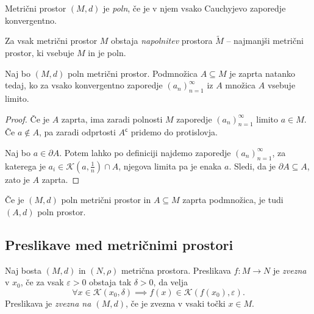 \documentclass[12pt, a4paper]{article}
\begin{document}
\obvs

\begin{definicija}
Metrični prostor $(M,d)$ je \emph{poln}, če je v njem vsako Cauchyjevo zaporedje konvergentno.
\end{definicija}

\begin{opomba}
Za vsak metrični prostor $M$ obstaja \emph{napolnitev} prostora $\widetilde{M}$ -- najmanjši metrični prostor, ki vsebuje $M$ in je poln.
\end{opomba}

\begin{trditev}
Naj bo $(M,d)$ poln metrični prostor. Podmnožica $A\subseteq M$ je zaprta natanko tedaj, ko za vsako konvergentno zaporedje $(a_n)_{n=1}^\infty$ iz $A$ množica $A$ vsebuje limito.
\end{trditev}

\begin{proof}
Če je $A$ zaprta, ima zaradi polnosti $M$ zaporedje $(a_n)_{n=1}^\infty$ limito $a\in M$. Če $a\not\in A$, pa zaradi odprtosti $A^\mathsf{c}$ pridemo do protislovja.

Naj bo $a\in\partial A$. Potem lahko po definiciji najdemo zaporedje $(a_n)_{n=1}^\infty$, za katerega je $a_i\in\mathcal{K}\left(a,\frac{1}{n}\right)\cap A$, njegova limita pa je enaka $a$. Sledi, da je $\partial A\subseteq A$, zato je $A$ zaprta.
\end{proof}

\begin{posledica}
Če je $(M,d)$ poln metrični prostor in $A\subseteq M$ zaprta podmnožica, je tudi $(A,d)$ poln prostor.
\end{posledica}

\newpage

\subsection{Preslikave med metričnimi prostori}

\begin{definicija}
Naj bosta $(M,d)$ in $(N,\rho)$ metrična prostora. Preslikava $f\colon M\to N$ je \emph{zvezna} v $x_0$, če za vsak $\varepsilon>0$ obstaja tak $\delta>0$, da velja
\[
\forall x\in\mathcal{K}(x_0,\delta)\implies f(x)\in\mathcal{K}(f(x_0),\varepsilon).
\]
Preslikava je \emph{zvezna na $(M,d)$}, če je zvezna v vsaki točki $x\in M$.
\end{definicija}
\end{document}
